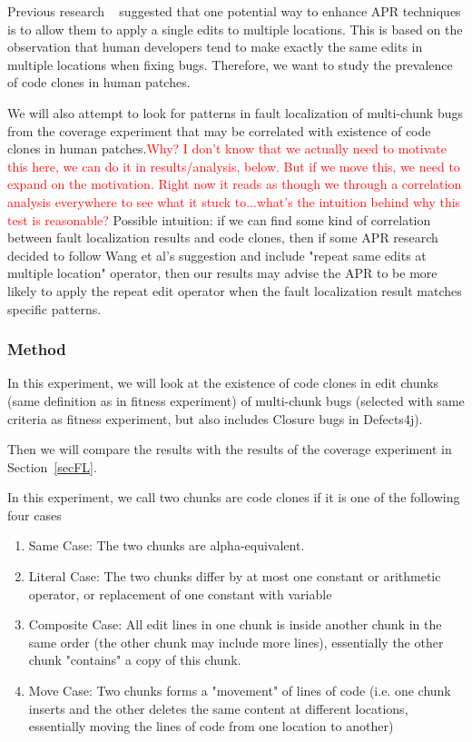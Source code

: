 \documentclass[sigconf, timestamp-false, anonymous=true]{acmart}
\newcommand\todo[1]{\textcolor{red}{#1}}
\begin{document}
Previous research ~\cite{wang2018} suggested that one potential way to enhance
APR techniques is to allow them to apply a single edits to multiple locations.
This is based on the observation that human developers tend to make exactly the 
same edits in multiple locations when fixing bugs. Therefore, we want to study the
prevalence of code clones in human patches.

We will also attempt to look for patterns in fault localization of multi-chunk bugs
from the coverage experiment that may be correlated with existence of code clones in 
human patches.\todo{Why? I don't know that we actually need to motivate this
  here, we can do it in results/analysis, below.  But if we move this, we need
  to expand on the motivation.  Right now it reads as though we through a
  correlation analysis everywhere to see what it stuck to...what's the intuition
  behind why this test is reasonable?}
Possible intuition: if we can find some kind of correlation between fault localization results
and code clones, then if some APR research decided to follow Wang et al's suggestion and
include "repeat same edits at multiple location" operator, then our results may advise
the APR to be more likely to apply the repeat edit operator when the fault localization
result matches specific patterns.

\subsubsection{Method}
\label{sec52}
In this experiment, we will look at the existence of code clones in 
edit chunks (same definition as in fitness experiment) of multi-chunk bugs (selected
with same criteria as fitness experiment, but also includes Closure bugs in Defects4j).

Then we will compare the results with the results of the coverage experiment in
Section~\ref{secFL}. 

In this experiment, we call two chunks are code clones if it is one of the following four cases
\begin{enumerate}
\item Same Case: The two chunks are alpha-equivalent. 
\item Literal Case: The two chunks differ by at most one constant or arithmetic operator,
 or replacement of one constant with variable 
\item Composite Case: All edit lines in one chunk is inside another chunk in the same order (the other chunk may include
more lines), essentially the other chunk "contains" a copy of this chunk.
\item Move Case: Two chunks forms a "movement" of lines of code (i.e. one chunk inserts and the other deletes the same
  content at different locations, essentially moving the lines of code from one location to another)
\end{enumerate}
\end{document}
